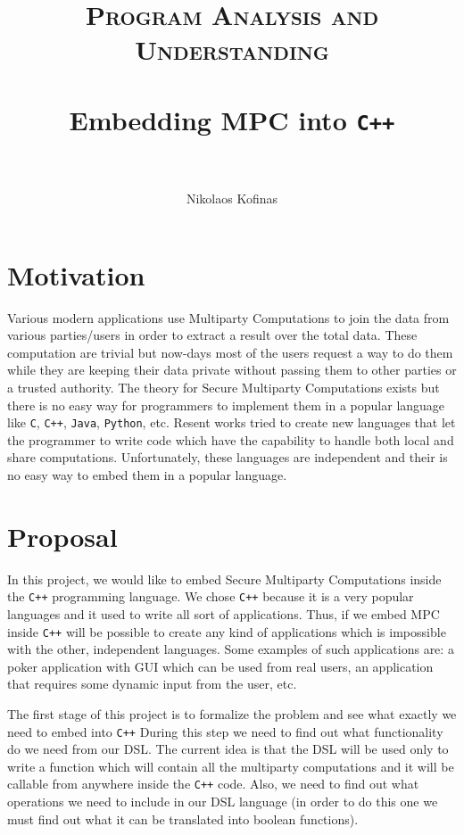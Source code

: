 \documentclass[paper=a4, fontsize=11pt]{scrartcl} %
\title{	
\vspace*{-2cm}
\normalfont \normalsize 
\textsc{Program Analysis and Understanding} \\ [10pt] %
\horrule{0.2pt} \\[0.2cm] %
\huge Embedding MPC into {\tt C++} \\ %
\horrule{2pt} \\[0.2cm] %
}
\author{Nikolaos Kofinas} %
\date{}%
\numberwithin{equation}{section} %
\numberwithin{figure}{section} %
\numberwithin{table}{section} %
\begin{document}
\maketitle %

\vspace*{-1.5cm}
\section{Motivation}
\vspace*{-0.2cm}
Various modern applications use Multiparty Computations to join the data from various parties/users in order to extract a result over the total data. These computation are trivial but now-days most of the users request a way to do them while they are keeping their data private without passing them to other parties or a trusted authority. The theory for Secure Multiparty Computations exists but there is no easy way for programmers to implement them in a popular language like {\tt C}, {\tt C++}, {\tt Java}, {\tt Python}, etc. Resent works tried to create new languages that let the programmer to write code which have the capability to handle both local and share computations. Unfortunately, these languages are independent and their is no easy way to embed them in a popular language. 

\vspace*{-0.5cm}
\section{Proposal}
\vspace*{-0.2cm}
In this project, we would like to embed Secure Multiparty Computations inside the {\tt C++} programming language. We chose {\tt C++} because it is a very popular languages and it used to write all sort of applications. Thus, if we embed MPC inside {\tt C++} will be possible to create any kind of applications which is impossible with the other, independent languages. Some examples of such applications are: a poker application with GUI which can be used from real users, an application that requires some dynamic input from the user, etc.

The first stage of this project is to formalize the problem and see what exactly we need to embed into {\tt C++}  During this step we need to find out what functionality do we need from our DSL. The current idea is that the DSL will be used only to write a function which will contain all the multiparty computations and it will be callable from anywhere inside the {\tt C++} code. Also, we need to find out what operations we need to include in our DSL language (in order to do this one we must find out what it can be translated into boolean functions).
\end{document}
